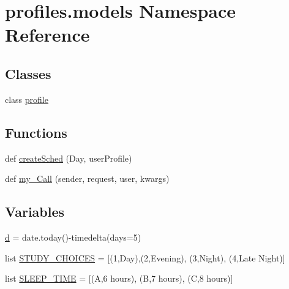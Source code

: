 \hypertarget{namespaceprofiles_1_1models}{}\section{profiles.\+models Namespace Reference}
\label{namespaceprofiles_1_1models}
\subsection*{Classes}
\begin{DoxyCompactItemize}
\item 
class \hyperlink{classprofiles_1_1models_1_1profile}{profile}
\end{DoxyCompactItemize}
\subsection*{Functions}
\begin{DoxyCompactItemize}
\item 
def \hyperlink{namespaceprofiles_1_1models_a67444d308f4467ef1d145b28659c4e29}{create\+Sched} (Day, user\+Profile)
\item 
def \hyperlink{namespaceprofiles_1_1models_a2074a6d8f585a84e52c9d1809cc95daf}{my\+\_\+\+Call} (sender, request, user, kwargs)
\end{DoxyCompactItemize}
\subsection*{Variables}
\begin{DoxyCompactItemize}
\item 
\hyperlink{namespaceprofiles_1_1models_a2ab65a67d2b0414ee05d3702bc47ab17}{d} = date.\+today()-\/timedelta(days=5)
\item 
list \hyperlink{namespaceprofiles_1_1models_a66a49fea9e1603c3395bc387e385d6e1}{S\+T\+U\+D\+Y\+\_\+\+C\+H\+O\+I\+C\+ES} = \mbox{[}(\textquotesingle{}1\textquotesingle{},\textquotesingle{}Day\textquotesingle{}),(\textquotesingle{}2\textquotesingle{},\textquotesingle{}Evening\textquotesingle{}), (\textquotesingle{}3\textquotesingle{},\textquotesingle{}Night\textquotesingle{}), (\textquotesingle{}4\textquotesingle{},\textquotesingle{}Late Night\textquotesingle{})\mbox{]}
\item 
list \hyperlink{namespaceprofiles_1_1models_a7111936f7e1fe09a6a5305105cc13029}{S\+L\+E\+E\+P\+\_\+\+T\+I\+ME} = \mbox{[}(\textquotesingle{}A\textquotesingle{},\textquotesingle{}6 hours\textquotesingle{}), (\textquotesingle{}B\textquotesingle{},\textquotesingle{}7 hours\textquotesingle{}), (\textquotesingle{}C\textquotesingle{},\textquotesingle{}8 hours\textquotesingle{})\mbox{]}
\end{DoxyCompactItemize}



